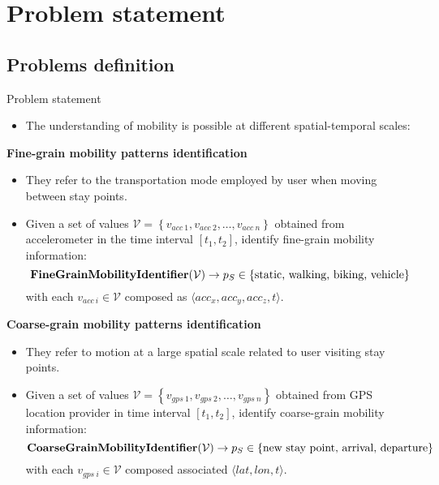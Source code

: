 \section{Problem statement}
\subsection{Problems definition}
\begin{frame}{Problem statement}
\small
\begin{itemize}
  \item The understanding of mobility is possible at different spatial-temporal scales:
\end{itemize}

\begin{exampleblock}{\small \textbf{Fine-grain mobility patterns identification}}
 \begin{itemize}
    \item They refer to the transportation mode employed by user when moving between stay points.
    \item Given a set of values $\mathcal{V} = \left \{ v_{acc~1},v_{acc~2},\ldots,v_{acc~n} \right \}$ obtained from accelerometer in the time interval $[t_1,t_2]$, identify fine-grain mobility information:
\begin{equation*}
  \text{\textbf{FineGrainMobilityIdentifier}}(\mathcal{V}) \rightarrow p_S \in \{ \text{static, walking, biking, vehicle} \}
\end{equation*}
with each $v_{acc~i} \in \mathcal{V}$ composed as $\langle acc_x,acc_y,acc_z,t \rangle$.
  \end{itemize} 
\end{exampleblock}

\begin{exampleblock}{\small \textbf{Coarse-grain mobility patterns identification}}
 \begin{itemize}
   \item They refer to motion at a large spatial scale related to user visiting stay points.
   \item \sloppy Given a set of values $\mathcal{V} = \left \{ v_{gps~1},v_{gps~2},\ldots,v_{gps~n} \right \}$ obtained from GPS location provider in time interval $[t_1,t_2]$, identify coarse-grain mobility information:
\begin{equation*}
    \text{\textbf{CoarseGrainMobilityIdentifier}}(\mathcal{V}) \rightarrow p_S \in \{ \text{new stay point, arrival, departure} \}
\end{equation*}
with each $v_{gps~i} \in \mathcal{V}$ composed associated $\langle lat, lon, t \rangle$.
 \end{itemize}
\end{exampleblock}
\end{frame}

